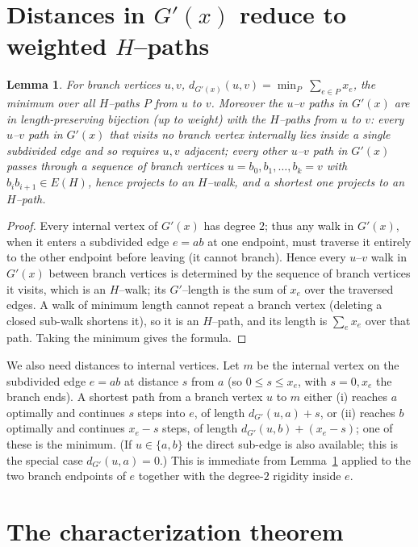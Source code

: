 \documentclass{amsart}
\newtheorem{lemma}{Lemma}
\theoremstyle{definition}
\begin{document}
\section{Distances in $G'(x)$ reduce to weighted $H$--paths}

\begin{lemma}\label{lem:distbranch}
For branch vertices $u,v$,
$d_{G'(x)}(u,v)=\min_{P}\ \sum_{e\in P}x_e$, the minimum over all $H$--paths $P$
from $u$ to $v$. Moreover the $u$--$v$ paths in $G'(x)$ are in length-preserving
bijection (up to weight) with the $H$--paths from $u$ to $v$: every $u$--$v$
path in $G'(x)$ that visits no branch vertex internally lies inside a single
subdivided edge and so requires $u,v$ adjacent; every other $u$--$v$ path in
$G'(x)$ passes through a sequence of branch vertices $u=b_0,b_1,\dots,b_k=v$ with
$b_{i}b_{i+1}\in E(H)$, hence projects to an $H$--walk, and a shortest one
projects to an $H$--path.
\end{lemma}

\begin{proof}
Every internal vertex of $G'(x)$ has degree $2$; thus any walk in $G'(x)$, when
it enters a subdivided edge $e=ab$ at one endpoint, must traverse it entirely to
the other endpoint before leaving (it cannot branch). Hence every $u$--$v$ walk
in $G'(x)$ between branch vertices is determined by the sequence of branch
vertices it visits, which is an $H$--walk; its $G'$--length is the sum of $x_e$
over the traversed edges. A walk of minimum length cannot repeat a branch vertex
(deleting a closed sub-walk shortens it), so it is an $H$--path, and its length
is $\sum_{e}x_e$ over that path. Taking the minimum gives the formula.
\end{proof}

We also need distances to internal vertices. Let $m$ be the internal vertex on
the subdivided edge $e=ab$ at distance $s$ from $a$ (so $0\le s\le x_e$, with
$s=0,x_e$ the branch ends). A shortest path from a branch vertex $u$ to $m$
either (i) reaches $a$ optimally and continues $s$ steps into $e$, of length
$d_{G'}(u,a)+s$, or (ii) reaches $b$ optimally and continues $x_e-s$ steps, of
length $d_{G'}(u,b)+(x_e-s)$; one of these is the minimum. (If $u\in\{a,b\}$ the
direct sub-edge is also available; this is the special case $d_{G'}(u,a)=0$.)
This is immediate from Lemma~\ref{lem:distbranch} applied to the two branch
endpoints of $e$ together with the degree-$2$ rigidity inside $e$.

\section{The characterization theorem}
\end{document}
